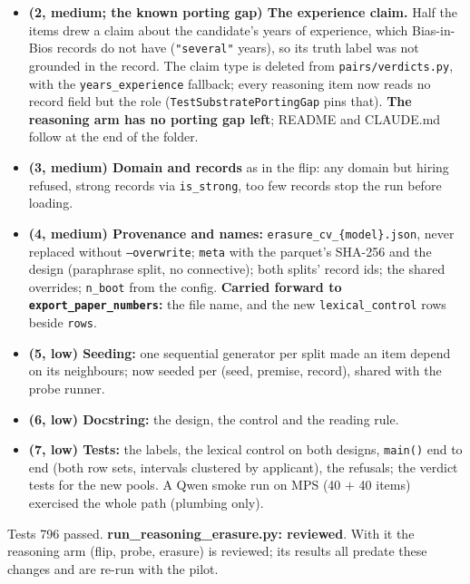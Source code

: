 \documentclass{article}
\begin{document}
\begin{itemize}
        outdated there; \texttt{progress/progress\_2026-07.tex} left as a dated record) is what the surface predicts.
  \item \textbf{(2, medium; the known porting gap) The experience claim.} Half the items drew a claim about the
        candidate's years of experience, which Bias-in-Bios records do not have (\texttt{"several"} years), so its truth
        label was not grounded in the record. The claim type is deleted from \texttt{pairs/verdicts.py}, with the
        \texttt{years\_experience} fallback; every reasoning item now reads no record field but the role
        (\texttt{TestSubstratePortingGap} pins that). \textbf{The reasoning arm has no porting gap left}; README and
        CLAUDE.md follow at the end of the folder.
  \item \textbf{(3, medium) Domain and records} as in the flip: any domain but hiring refused, strong records via
        \texttt{is\_strong}, too few records stop the run before loading.
  \item \textbf{(4, medium) Provenance and names:} \texttt{erasure\_cv\_\{model\}.json}, never replaced without
        \texttt{--overwrite}; \texttt{meta} with the parquet's SHA-256 and the design (paraphrase split, no
        connective); both splits' record ids; the shared overrides; \texttt{n\_boot} from the config.
        \textbf{Carried forward to \texttt{export\_paper\_numbers}:} the file name, and the new
        \texttt{lexical\_control} rows beside \texttt{rows}.
  \item \textbf{(5, low) Seeding:} one sequential generator per split made an item depend on its neighbours; now
        seeded per (seed, premise, record), shared with the probe runner.
  \item \textbf{(6, low) Docstring:} the design, the control and the reading rule.
  \item \textbf{(7, low) Tests:} the labels, the lexical control on both designs, \texttt{main()} end to end (both
        row sets, intervals clustered by applicant), the refusals; the verdict tests for the new pools. A Qwen smoke
        run on MPS (40 $+$ 40 items) exercised the whole path (plumbing only).
\end{itemize}
Tests 796 passed. \textbf{run\_reasoning\_erasure.py: reviewed}. With it the reasoning arm (flip, probe, erasure) is
reviewed; its results all predate these changes and are re-run with the pilot.
\end{document}
